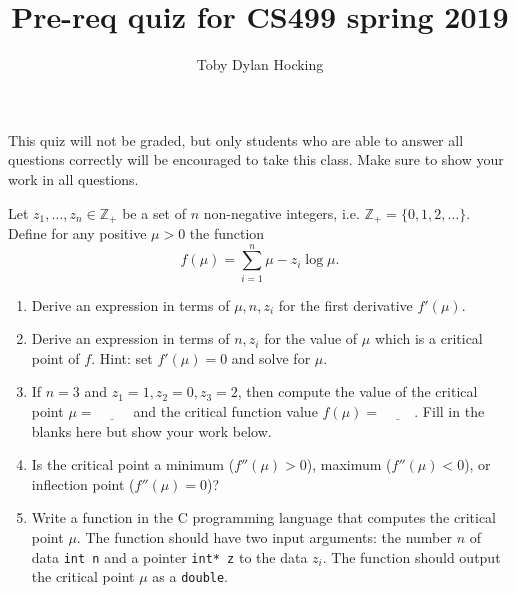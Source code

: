 \documentclass{article}
\begin{document}
\title{Pre-req quiz for CS499 spring 2019}
\author{Toby Dylan Hocking}
\thispagestyle{empty}

This quiz will not be graded, but only students who are able to answer
all questions correctly will be encouraged to take this class. Make
sure to show your work in all questions.

Let $z_1, \dots, z_n\in\mathbb Z_+$ be a set of $n$ non-negative integers,
i.e. $\mathbb Z_+=\{0, 1, 2, \dots\}$. Define for any positive $\mu>0$ the function
$$ f(\mu) = \sum_{i=1}^n \mu - z_i\log \mu. $$

\begin{enumerate}
\item Derive an expression in terms of $\mu,n,z_i$ for the first derivative
  $f'(\mu)$. 

\vskip 1in
\item Derive an expression in terms of $n,z_i$ for the value of $\mu$
  which is a critical point of $f$. Hint: set $f'(\mu)=0$ and solve
  for $\mu$.

\vskip 1in
\item If $n=3$ and $z_1=1, z_2=0, z_3=2$, then compute the value of
  the critical point $\mu=\underline{\hspace{1cm}}$ and the critical
  function value $f(\mu)=\underline{\hspace{1cm}}$. Fill in the blanks
  here but show your work below.

\vskip 1in
\item Is the critical point a minimum ($f''(\mu)>0$), maximum
  ($f''(\mu)<0$), or inflection point ($f''(\mu)=0$)?

\vskip 1in
\item Write a function in the C programming language that computes the
  critical point $\mu$. The function should have two input arguments:
  the number $n$ of data \texttt{int n} and a pointer \texttt{int* z}
  to the data $z_i$. The function should output the critical point
  $\mu$ as a \texttt{double}.
\end{enumerate}
\end{document}
